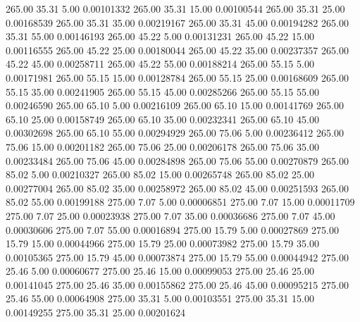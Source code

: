     265.00     35.31      5.00     0.00101332
    265.00     35.31     15.00     0.00100544
    265.00     35.31     25.00     0.00168539
    265.00     35.31     35.00     0.00219167
    265.00     35.31     45.00     0.00194282
    265.00     35.31     55.00     0.00146193
    265.00     45.22      5.00     0.00131231
    265.00     45.22     15.00     0.00116555
    265.00     45.22     25.00     0.00180044
    265.00     45.22     35.00     0.00237357
    265.00     45.22     45.00     0.00258711
    265.00     45.22     55.00     0.00188214
    265.00     55.15      5.00     0.00171981
    265.00     55.15     15.00     0.00128784
    265.00     55.15     25.00     0.00168609
    265.00     55.15     35.00     0.00241905
    265.00     55.15     45.00     0.00285266
    265.00     55.15     55.00     0.00246590
    265.00     65.10      5.00     0.00216109
    265.00     65.10     15.00     0.00141769
    265.00     65.10     25.00     0.00158749
    265.00     65.10     35.00     0.00232341
    265.00     65.10     45.00     0.00302698
    265.00     65.10     55.00     0.00294929
    265.00     75.06      5.00     0.00236412
    265.00     75.06     15.00     0.00201182
    265.00     75.06     25.00     0.00206178
    265.00     75.06     35.00     0.00233484
    265.00     75.06     45.00     0.00284898
    265.00     75.06     55.00     0.00270879
    265.00     85.02      5.00     0.00210327
    265.00     85.02     15.00     0.00265748
    265.00     85.02     25.00     0.00277004
    265.00     85.02     35.00     0.00258972
    265.00     85.02     45.00     0.00251593
    265.00     85.02     55.00     0.00199188
    275.00      7.07      5.00     0.00006851
    275.00      7.07     15.00     0.00011709
    275.00      7.07     25.00     0.00023938
    275.00      7.07     35.00     0.00036686
    275.00      7.07     45.00     0.00030606
    275.00      7.07     55.00     0.00016894
    275.00     15.79      5.00     0.00027869
    275.00     15.79     15.00     0.00044966
    275.00     15.79     25.00     0.00073982
    275.00     15.79     35.00     0.00105365
    275.00     15.79     45.00     0.00073874
    275.00     15.79     55.00     0.00044942
    275.00     25.46      5.00     0.00060677
    275.00     25.46     15.00     0.00099053
    275.00     25.46     25.00     0.00141045
    275.00     25.46     35.00     0.00155862
    275.00     25.46     45.00     0.00095215
    275.00     25.46     55.00     0.00064908
    275.00     35.31      5.00     0.00103551
    275.00     35.31     15.00     0.00149255
    275.00     35.31     25.00     0.00201624
